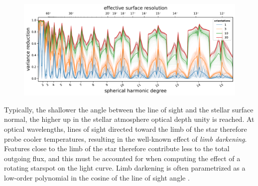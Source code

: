 \documentclass[modern,linenumbers]{aastex62}
\begin{document}
\begin{figure}[t!]
    \begin{centering}
        \includegraphics[width=\linewidth]{figures/nullspace_ensemble_ld.pdf}
    \end{centering}
\end{figure}

Typically, the shallower the angle between the line of sight
and the stellar surface normal, the higher up in the stellar
atmosphere optical depth unity is reached. At optical wavelengths,
lines of sight directed toward the limb of the star therefore
probe cooler temperatures, resulting in the well-known effect of
\emph{limb darkening}. Features close to the limb of the star therefore
contribute less to the total outgoing flux, and this must be
accounted for when computing the effect of a rotating starspot
on the light curve. Limb darkening is often parametrized
as a low-order polynomial in the cosine of the line of sight angle
\citep{Kopal1950}.
\end{document}
